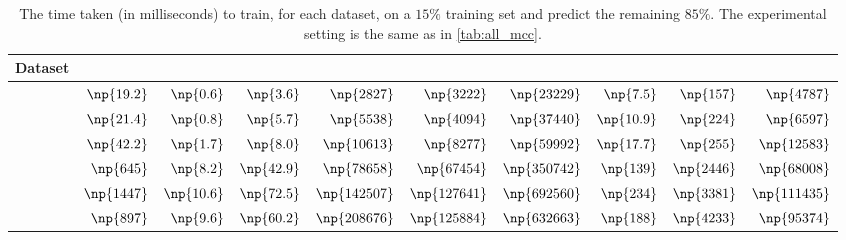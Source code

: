 \begin{table}[htb]
\begin{adjustwidth}{-2cm}{}
  \centering
  \scriptsize
  \caption{The time taken (in milliseconds) to train, for each dataset, on a $15\%$ training set and
    predict the remaining $85\%$. The experimental setting is the same as in \autoref{tab:all_mcc}.
  \label{tab:all_time}}
  \begin{tabulary}{179mm}{lrrrr|rrrrr}
    \toprule
    Dataset & \uslpropGsec{} & \usrule{}   & \uslogregp{} & \usoptim{}    & \complowrank{} & \compmaxnorm{} & \comptriads{} & \compranknodes{} & \compbayesian{} \\
    \midrule
    \aut{}  & $\np{19.2}$    & $\np{0.6}$  & $\np{3.6}$   & $\np{2827}$   & $\np{3222}$    & $\np{23229}$   & $\np{7.5}$    & $\np{157}$       & $\np{4787}$     \\
    \adv{}  & $\np{21.4}$    & $\np{0.8}$  & $\np{5.7}$   & $\np{5538}$   & $\np{4094}$    & $\np{37440}$   & $\np{10.9}$   & $\np{224}$       & $\np{6597}$     \\
    \wik{}  & $\np{42.2}$    & $\np{1.7}$  & $\np{8.0}$   & $\np{10613}$  & $\np{8277}$    & $\np{59992}$   & $\np{17.7}$   & $\np{255}$       & $\np{12583}$    \\
    \sla{}  & $\np{645}$     & $\np{8.2}$  & $\np{42.9}$  & $\np{78658}$  & $\np{67454}$   & $\np{350742}$  & $\np{139}$    & $\np{2446}$      & $\np{68008}$    \\
    \epi{}  & $\np{1447}$    & $\np{10.6}$ & $\np{72.5}$  & $\np{142507}$ & $\np{127641}$  & $\np{692560}$  & $\np{234}$    & $\np{3381}$      & $\np{111435}$   \\
    \kiw{}  & $\np{897}$     & $\np{9.6}$  & $\np{60.2}$  & $\np{208676}$ & $\np{125884}$  & $\np{632663}$  & $\np{188}$    & $\np{4233}$      & $\np{95374}$    \\
    \bottomrule
  \end{tabulary}
\end{adjustwidth}
\end{table}

